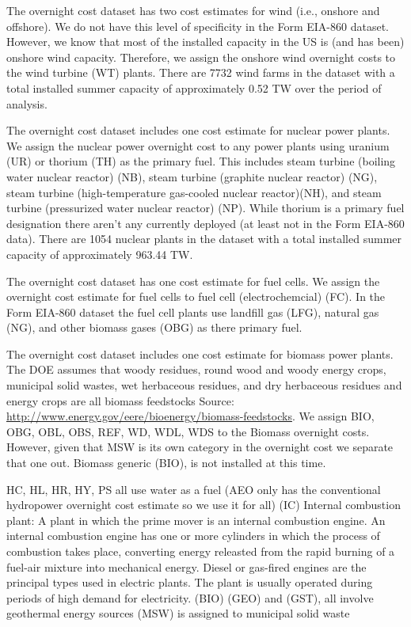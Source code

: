 \documentclass[10pt]{amsart}
\begin{document}
The overnight cost dataset has two cost estimates for wind (i.e., onshore and offshore).
We do not have this level of specificity in the Form EIA-860 dataset. 
However, we know that most of the installed capacity in the US is (and has been) onshore wind capacity. 
Therefore, we assign the onshore wind overnight costs to the wind turbine (WT) plants. 
There are 7732 wind farms in the dataset with a total installed summer capacity of approximately 0.52 TW over the period of analysis. 

The overnight cost dataset includes one cost estimate for nuclear power plants.
We assign the nuclear power overnight cost to any power plants using uranium (UR) or thorium (TH) as the primary fuel.  
This includes steam turbine (boiling water nuclear reactor) (NB), steam turbine (graphite nuclear reactor) (NG), steam turbine (high-temperature gas-cooled nuclear reactor)(NH), and steam turbine (pressurized water nuclear reactor) (NP).
While thorium is a primary fuel designation there aren't any currently deployed (at least not in the Form EIA-860 data).   
There are 1054 nuclear plants in the dataset with a total installed summer capacity of approximately 963.44 TW.

The overnight cost dataset has one cost estimate for fuel cells.
We assign the overnight cost estimate for fuel cells to fuel cell (electrochemcial) (FC). 
In the Form EIA-860 dataset the fuel cell plants use landfill gas (LFG), natural gas (NG), and other biomass gases (OBG) as there primary fuel. 

The overnight cost dataset includes one cost estimate for biomass power plants. 
The DOE assumes that woody residues, round wood and woody energy crops, municipal solid wastes, wet herbaceous residues, and dry herbaceous residues and energy 
crops are all biomass feedstocks Source: \url{http://www.energy.gov/eere/bioenergy/biomass-feedstocks}. 
We assign BIO, OBG, OBL, OBS, REF, WD, WDL, WDS to the Biomass overnight costs. However, given that MSW is its own category in the overnight cost we separate that one out.
 Biomass generic (BIO),  is not installed at this time.  
\begin{table}

\end{table}

HC, HL, HR, HY, PS all use water as a fuel (AEO only has the conventional hydropower overnight cost estimate so we use it for all)
(IC) Internal combustion plant: A plant in which the prime mover is an internal combustion engine. An internal combustion engine has one or more cylinders in which the process of combustion takes place, converting energy releasted from the rapid burning of a fuel-air mixture into mechanical energy. Diesel or gas-fired engines are the principal types used in electric plants. The plant is usually operated during periods of high demand for electricity.
(BIO) 
(GEO) and (GST), all involve geothermal energy sources
(MSW) is assigned to municipal solid waste
\end{document}
